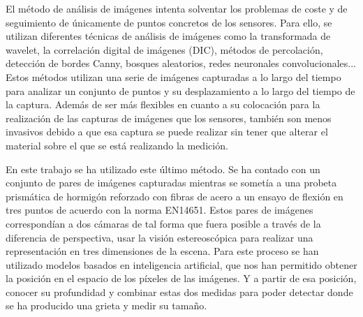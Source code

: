 El método de análisis de imágenes intenta solventar los problemas de coste y de seguimiento de únicamente de puntos concretos de los sensores. Para ello, se utilizan diferentes técnicas de análisis de imágenes \cite{Khan2023Image} como la transformada de wavelet, la correlación digital de imágenes (DIC), métodos de percolación, detección de bordes Canny, bosques aleatorios, redes neuronales convolucionales... Estos métodos utilizan una serie de imágenes capturadas a lo largo del tiempo para analizar un conjunto de puntos y su desplazamiento a lo largo del tiempo de la captura. Además de ser más flexibles en cuanto a su colocación para la realización de las capturas de imágenes que los sensores, también son menos invasivos debido a que esa captura se puede realizar sin tener que alterar el material sobre el que se está realizando la medición.

En este trabajo se ha utilizado este último método. Se ha contado con un conjunto de pares de imágenes capturadas mientras se sometía a una probeta prismática de hormigón reforzado con fibras de acero a un ensayo de flexión en tres puntos de acuerdo con la norma EN14651. Estos pares de imágenes correspondían a dos cámaras de tal forma que fuera posible a través de la diferencia de perspectiva, usar la visión estereoscópica para realizar una representación en tres dimensiones de la escena. Para este proceso se han utilizado modelos basados en inteligencia artificial, que nos han permitido obtener la posición en el espacio de los píxeles de las imágenes. Y a partir de esa posición, conocer su profundidad y combinar estas dos medidas para poder detectar donde se ha producido una grieta y medir su tamaño.
